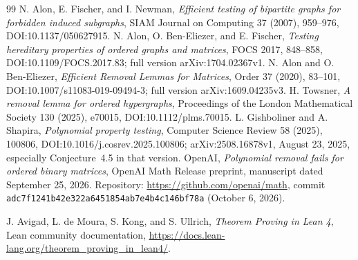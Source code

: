 \documentclass[11pt]{article}
\newcommand{\code}[1]{{\small\nolinkurl{#1}}}
\begin{document}
\begin{thebibliography}{99}
 N. Alon, E. Fischer, and I. Newman,
\emph{Efficient testing of bipartite graphs for forbidden induced subgraphs},
SIAM Journal on Computing 37 (2007), 959--976,
DOI:10.1137/050627915.
 N. Alon, O. Ben-Eliezer, and E. Fischer,
\emph{Testing hereditary properties of ordered graphs and matrices},
FOCS 2017, 848--858, DOI:10.1109/FOCS.2017.83;
full version arXiv:1704.02367v1.
 N. Alon and O. Ben-Eliezer,
\emph{Efficient Removal Lemmas for Matrices}, Order 37 (2020), 83--101,
DOI:10.1007/s11083-019-09494-3; full version arXiv:1609.04235v3.
 H. Towsner, \emph{A removal lemma for ordered hypergraphs},
Proceedings of the London Mathematical Society 130 (2025), e70015,
DOI:10.1112/plms.70015.
 L. Gishboliner and A. Shapira,
\emph{Polynomial property testing}, Computer Science Review 58 (2025),
100806, DOI:10.1016/j.cosrev.2025.100806; arXiv:2508.16878v1,
August 23, 2025, especially Conjecture~4.5 in that version.
 OpenAI, \emph{Polynomial removal fails for ordered binary matrices},
OpenAI Math Release preprint, manuscript dated September 25, 2026.
Repository: \url{https://github.com/openai/math},
commit \code{adc7f1241b42e322a6451854ab7e4b4c146bf78a} (October 6, 2026).

 J. Avigad, L. de Moura, S. Kong, and S. Ullrich,
\emph{Theorem Proving in Lean 4}, Lean community documentation,
\url{https://docs.lean-lang.org/theorem_proving_in_lean4/}.
\end{thebibliography}
\end{document}
